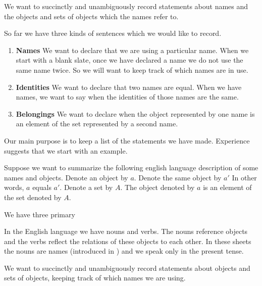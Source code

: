 

We want to succinctly and unambiguously record statements about names and the objects and sets of objects which the names refer to.


So far we have three kinds of sentences which we would like to record.

\begin{enumerate}

  \item
  \textbf{Names}
  We want to declare that we are using a particular name.
  When we start with a blank slate, once we have declared a name we do not use the same name twice.
  So we will want to keep track of which names are in use.

  \item
  \textbf{Identities}
  We want to declare that two names are equal.
  When we have names, we want to say when the identities of those names are the same.

  \item
  \textbf{Belongings}
  We want to declare when the object represented by one name is an element of the set represented by a second name.

\end{enumerate}

Our main purpose is to keep a list of the statements we have made.
Experience suggests that we start with an example.

Suppose we want to summarize the following english language description of some names and objects.
Denote an object by $a$.
Denote the same object by $a'$
In other words, $a$ equals $a'$.
Denote a set by $A$.
The object denoted by $a$ is an element of the set denoted by $A$.

\begin{account}[Example]
\end{account}

We have three primary

In the English language we have nouns and verbs.
The nouns reference objects and the verbs reflect the relations of these objects to each other.
In these sheets the nouns are names (introduced in ) and we speak only in the present tense.


We want to succinctly and unambiguously record statements about objects and sets of objects, keeping track of which names we are using.

